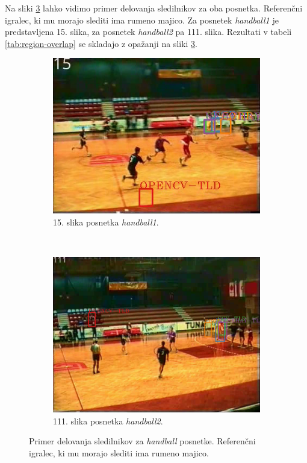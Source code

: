 Na sliki \ref{fig:tracker-visual} lahko vidimo primer delovanja sledilnikov za oba posnetka. Referenčni igralec, ki mu morajo slediti ima rumeno majico. Za posnetek \textit{handball1} je predstavljena 15. slika, za posnetek \textit{handball2} pa 111. slika. Rezultati v tabeli \ref{tab:region-overlap} se skladajo z opažanji na sliki \ref{fig:tracker-visual}.

\begin{figure}[!htbp]
	\centering
	
	\begin{subfigure}[t]{0.45\columnwidth}
		\includegraphics[width=\columnwidth]{./Slike/handball1-example.png}
		\caption{15. slika posnetka \textit{handball1}.}
		\label{fig:handball1}
	\end{subfigure}
	~
	\begin{subfigure}[t]{0.45\columnwidth}
		\includegraphics[width=\columnwidth]{./Slike/handball2-example.png}
		\caption{111. slika posnetka \textit{handball2}.}
		\label{fig:handball2}
	\end{subfigure}  
	\caption[Primer delovanja sledilnikov za \textit{handball} posnetke]{Primer delovanja sledilnikov za \textit{handball} posnetke. Referenčni igralec, ki mu morajo slediti ima rumeno majico. }
	\label{fig:tracker-visual}
\end{figure}




